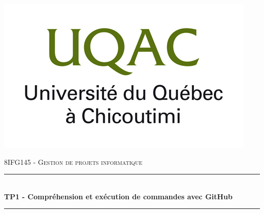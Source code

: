 \documentclass[11pt,canadien]{article}
\begin{document}
\newcommand{\sectionbreak}{\clearpage} %

\newcommand{\antoine}{Antoine \textsc{Moreau}}
\newcommand{\estelle}{Estelle \textsc{Michel}}
\newcommand{\joffrey}{Joffrey \textsc{Germain}}
\newcommand{\julien}{Julien \textsc{Naty-Daufin}}
\newcommand{\karen}{Karen \textsc{Migan}}
\newcommand{\kevin}{Kévin \textsc{Seroux}}
\newcommand{\valentin}{Valentin \textsc{Tertois}}

\begin{titlepage}

\newcommand{\HRule}{\rule{\linewidth}{0.5mm}} %

\center %
 

\includegraphics[width=\textwidth]{images/uqac_logo.jpg} %
 
\textsc{\LARGE 8IFG145 - Gestion de projets informatique}\\[0.5cm]


\HRule \\[0.4cm]
{ \huge \bfseries TP1 - Compréhension et exécution de commandes avec GitHub}\\[0.4cm]
\HRule \\[0.5cm]
 


\end{titlepage}
\end{document}
